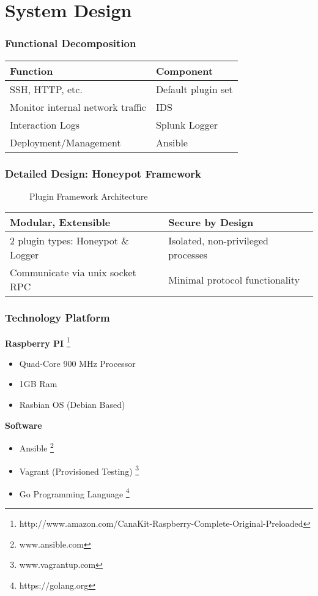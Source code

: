 \section{System Design}

\begin{frame}
\frametitle{Functional Decomposition}
\centering

\begin{tabular}{l | l}
\toprule
\textbf{Function} & \textbf{Component} \\
\midrule
SSH, HTTP, etc. & Default plugin set \\
Monitor internal network traffic & IDS \\
Interaction Logs & Splunk Logger \\
Deployment/Management & Ansible\\

\bottomrule
\end{tabular}

\end{frame}

\begin{frame}
\frametitle{Detailed Design: Honeypot Framework}

\begin{figure}
\centering
\caption{Plugin Framework Architecture}
{
\scalebox{0.7}{}
}
\end{figure}

\begin{table}
\centering
\small
\begin{tabularx}{\linewidth}{l l}
\textbf{Modular, Extensible} & \textbf{Secure by Design} \\
\midrule
2 plugin types: Honeypot \& Logger & Isolated, non-privileged processes \\
Communicate via unix socket RPC & Minimal protocol functionality \\
\end{tabularx}
\end{table}
\end{frame}

\begin{frame}
\frametitle{Technology Platform}
\textbf{Raspberry PI} \footnote{http://www.amazon.com/CanaKit-Raspberry-Complete-Original-Preloaded}
\begin{itemize}
\item Quad-Core 900 MHz Processor
\item 1GB Ram
\item Rasbian OS (Debian Based) 
\end{itemize}

\textbf{Software}
\begin{itemize}
\item Ansible \footnote{www.ansible.com}
\item Vagrant (Provisioned Testing) \footnote{www.vagrantup.com}
\item Go Programming Language \footnote{https://golang.org}
\end{itemize}


\end{frame}

